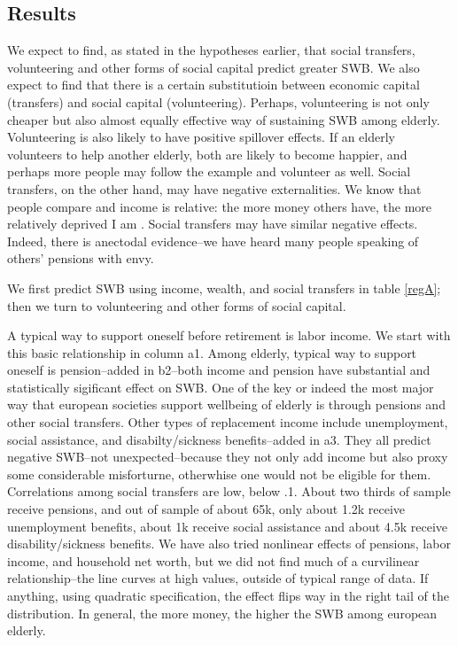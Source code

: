 \documentclass[10pt, letterpaper]{article}
\begin{document}
\begin{spacing}{1.4}
\section{Results}


 We expect to
find, as stated in the hypotheses earlier, that social transfers, volunteering
and other forms of social capital predict greater SWB. We also expect to
find that there is a  certain substitutioin  between economic capital (transfers) and social
capital (volunteering). Perhaps, volunteering is not only cheaper but also almost equally
effective way of sustaining SWB among elderly. Volunteering is also likely to have
positive spillover effects. If an elderly volunteers to help another elderly,
both are  likely to become happier, and perhaps more people may follow the
example and volunteer as well. Social transfers, on the other hand, may have
negative externalities. We know that people compare and income is relative: the
more money others have, the more relatively deprived I am
\citep{michalos85,luttmer05,bender12}. Social transfers may have similar negative
effects. Indeed, there is anectodal evidence--we have heard many people speaking
of others' pensions with envy.

We first predict SWB using income, wealth, and social transfers in table \ref{regA}; then we turn
to volunteering and other forms of social capital.

A typical way to support oneself
before retirement is labor
income. We start with this basic relationship in column a1. Among elderly,
 typical way to support oneself is pension--added in b2--both income and pension 
have substantial and statistically sigificant effect on SWB. 
%
One of the key or indeed the most major way that european societies support
wellbeing of elderly is through pensions and other social transfers.
%
Other types of replacement income include unemployment, social assistance, and disabilty/sickness
benefits--added in a3. They all predict negative SWB--not unexpected--because
they not only add income but also proxy some considerable misforturne,
otherwhise one would not be eligible for them. 
%
Correlations among social transfers are low, below .1. About two thirds of
sample receive pensions, and out of sample of about 65k, only about 1.2k receive
unemployment benefits,  about 1k receive social assistance and about 4.5k
receive disability/sickness benefits.
%
We have also tried nonlinear effects of pensions, labor income, and household
net worth, but we did not find much of a curvilinear
relationship--the line curves at high values, outside of typical range of data. If anything, using quadratic specification, the effect flips way in the right tail of the distribution.
In general, the more money, the higher the SWB among european elderly. 


\end{spacing}
\end{document}
